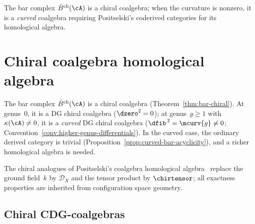The bar complex $\bar{B}^{\mathrm{ch}}(\cA)$ is a chiral coalgebra; when the curvature is nonzero, it is a \emph{curved} coalgebra requiring Positselski's coderived categories for its homological algebra.
\fi

\section{Chiral coalgebra homological algebra}
\label{sec:chiral-coalgebra-homalg}

The bar complex $\bar{B}^{\mathrm{ch}}(\cA)$ is a chiral coalgebra
(Theorem~\ref{thm:bar-chiral}).  At genus~$0$, it is a
DG chiral coalgebra ($\dzero^2 = 0$); at genus~$g \geq 1$ with
$\kappa(\cA) \neq 0$, it is a \emph{curved} DG chiral coalgebra
($\dfib^{\,2} = \mcurv{g} \neq 0$; Convention~\ref{conv:higher-genus-differentials}).  In the curved case, the ordinary
derived category is trivial
(Proposition~\ref{prop:curved-bar-acyclicity}), and a richer
homological algebra is needed.

The chiral analogues of Positselski's coalgebra homological
algebra~\cite{Positselski11} replace the ground field~$k$ by
$\mathcal{D}_X$ and the tensor product by $\chirtensor$; all
exactness properties are inherited from configuration space geometry.

\subsection{Chiral CDG-coalgebras}
\label{subsec:chiral-CDG-coalgebra}

